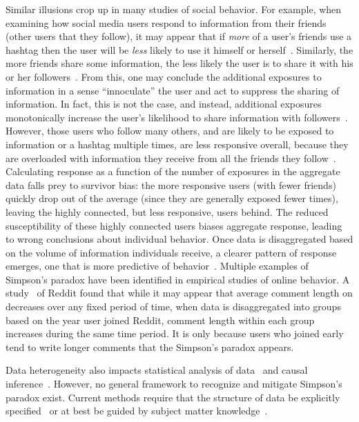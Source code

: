 Similar illusions crop up in many studies of social behavior. For example, when examining how social media users respond to information from their friends (other users that they follow), it may appear that if \emph{more} of a user's friends use a hashtag then the user will be \emph{less} likely to use it himself or herself~\cite{Romero11www}. Similarly, the more friends share some information, the less likely the user is to share it with his or her followers~\cite{Versteeg11icwsm}. From this, one may conclude the additional exposures to information in a sense ``innoculate'' the user and act to suppress the sharing of information. In fact, this is not the case, and instead, additional exposures monotonically increase the user's likelihood to share information with followers~\cite{Lerman2016futureinternet}. However, those users who follow many others, and are likely to be exposed to information or a hashtag multiple times, are less responsive overall, because they are overloaded with information they receive from all the friends they follow~\cite{Hodas12socialcom}. Calculating response as a function of the number of exposures in the aggregate data falls prey to survivor bias: the more responsive users (with fewer friends) quickly drop out of the average (since they are generally exposed fewer times), leaving the highly connected, but less responsive, users behind.  The reduced susceptibility of these highly connected users biases aggregate response, leading to wrong conclusions about individual behavior. Once data is disaggregated based on the volume of information individuals receive, a clearer pattern of response emerges, one that is more predictive of behavior~\cite{Hodas14srep}. Multiple examples of Simpson's paradox have been identified in empirical studies of online behavior. A study~\cite{Barbosa2016} of Reddit found that while it may appear that average comment length on decreases over any fixed period of time, when data is disaggregated into groups based on the year user joined Reddit, comment length within each group increases during the same time period. It is only because users who joined early tend to write longer comments that the Simpson's paradox appears.

Data heterogeneity also impacts statistical analysis of data~\cite{estes1956problem} and causal inference~\cite{Xie2013population}. However, no general framework to recognize and mitigate Simpson's paradox exist. Current methods require that the structure of data be explicitly specified~\cite{Bareinboim2016causal} or at best be guided by subject matter knowledge~\cite{Hernan2011}.

